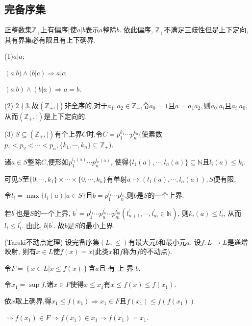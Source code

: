 \subsection{完备序集}
\begin{4}
正整数集$\mathbb{Z}_+$上有偏序$|$使$a|b$表示$a$整除$b$. 
依此偏序, $\mathbb{Z}_+$不满足三歧性但是上下定向,其有界集必有限且有上下确界.
\end{4}
\begin{solution}

(1)\quad $a|a;$

$(a|b)\land(b|c)\Rightarrow a|c;$

$(a|b)\land (b|a)\Rightarrow a=b.$

(2) $2\nmid 3,$故$(\mathbb{Z}_+,|)$非全序的,对于$a_1,a_2\in \mathbb{Z}_+$,令$a_0=1$且$a=a_1a_2,$则$a_0|a_i$且$a_i|a_0,$从而$(\mathbb{Z}_+,|)$是上下定向的.

(3) $S\subseteq (\mathbb{Z}_+,|)$有个上界$C$时,令$C=p_1^{k_1}\cdots p_n^{k_n}($使素数$p_1<p_2<\cdots<p_n,\{k_1,\cdots,k_n\}\subseteq\mathbb{Z}_+).$

诸$a\in S$整除$C$,便形如$p_1^{l_1(a)}\cdots p_n^{l_n(a)}$, 
使得$\{l_1(a),\cdots,l_n(a)\}\subseteq\mathbb{N}$且$l_i(a)\leqslant k_i$.

可见$S$至$\{0,\cdots,k_1\}\times\cdots\times\{0,\cdots,k_n\}$有单射$a\mapsto(l_1(a),\cdots,l_n(a)),S$便有限.

令$l_i=\max\{l_i(a)|a\in S\}$且$b=p_1^{l_1}\cdots p_n^{l_n}$,则$b$是$S$的一个上界.

若$b^{\prime}$也是$S$的一个上界, $b^{\prime}=p_1^{l_1^{\prime}}\cdots p_n^{l_n^{\prime}}\cdots p_m^{l_m^{\prime}}(l_{n+1}^{\prime},\cdots,l_m^{\prime}\in \mathbb{N})$, 
则$k_i(a)\leqslant l_i^{\prime}$, 从而$l_i \leqslant l_i^{\prime}$. 
由此, $b|b^{\prime}$. 故$b$是$S$的最小上界.
\end{solution}
\begin{5}
(Tarski不动点定理)  设完备序集$(L,\leqslant)$有最大元$b$和最小元$a$. 
设$f:L\to L$是递增映射, 则有$x\in L$使$f( x) = x$(此类$x$和$f$称为$f$的不动点).
   \end{5}
\begin{solution}
令$F= \left\{ x\in L| x\leqslant f( x) \right\}$含$a$且 有 上 界 $b$.

令$x_1= \sup f$,诸$x\in F$使得$x\leqslant x_1$有$x\leqslant f(x)\leqslant f( x_1)$.

 依$x$取上确界,得$x_1\leqslant f(x_1)\Rightarrow x_1\in F$且$f(x_1)\leqslant f(f(x_1))$
 
 $\Rightarrow f(x_1)\in F \Rightarrow f(x_1)\in x_1\Rightarrow f(x_1)=x_1$.
\end{solution}


